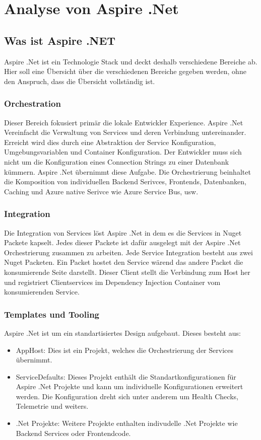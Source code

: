 \section{Analyse von Aspire .Net}

    \subsection{Was ist Aspire .NET}
        Aspire .Net ist ein Technologie Stack und deckt deshalb verschiedene Bereiche ab. Hier soll eine Übersicht über die verschiedenen Bereiche gegeben werden, ohne den Anspruch, dass die Übersicht vollständig ist.

        \subsubsection{Orchestration}
            Dieser Bereich fokusiert primär die lokale Entwickler Experience. Aspire .Net Vereinfacht die Verwaltung von Services und deren Verbindung untereinander. Erreicht wird dies durch eine Abstraktion der Service Konfiguration, Umgebungsvariablen und Container Konfiguration. Der Entwickler muss sich nicht um die Konfiguration eines Connection Strings zu einer Datenbank kümmern. Aspire .Net übernimmt diese Aufgabe. Die Orchestrierung beinhaltet die Komposition von individuellen Backend Serivces, Frontends, Datenbanken, Caching und Azure native Serivce wie Azure Service Bus, usw.

        \subsubsection{Integration}
            Die Integration von Services löst Aspire .Net in dem es die Services in Nuget Packete kapselt. Jedes dieser Packete ist dafür ausgelegt mit der Aspire .Net Orchestrierung zusammen zu arbeiten. Jede Service Integration besteht aus zwei Nuget Packeten. Ein Packet hostet den Service wärend das andere Packet die konsumierende Seite darstellt. Dieser Client stellt die Verbindung zum Host her und registriert Clientservices im Dependency Injection Container vom konsumierenden Service.

        \subsubsection{Templates und Tooling}
            Aspire .Net ist um ein standartisiertes Design aufgebaut. Dieses besteht aus:
            \begin{itemize}
                \item AppHost: Dies ist ein Projekt, welches die Orchestrierung der Services übernimmt.
                \item ServiceDefaults: Dieses Projekt enthält die Standartkonfigurationen für Aspire .Net Projekte und kann um individuelle Konfigurationen erweitert werden. Die Konfiguration dreht sich unter anderem um Health Checks, Telemetrie und weiters.
                \item .Net Projekte: Weitere Projekte enthalten indivudelle .Net Projekte wie Backend Services oder Frontendcode.
            \end{itemize}



